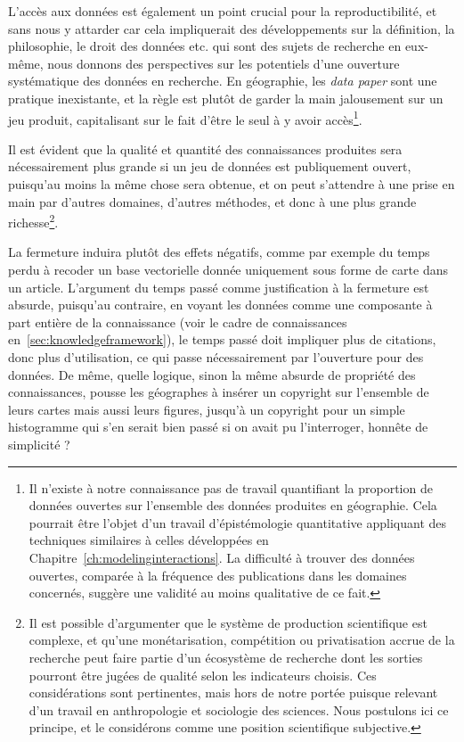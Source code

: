 L'accès aux données est également un point crucial pour la reproductibilité, et sans nous y attarder car cela impliquerait des développements sur la définition, la philosophie, le droit des données etc. qui sont des sujets de recherche en eux-même, nous donnons des perspectives sur les potentiels d'une ouverture systématique des données en recherche. En géographie, les \emph{data paper} sont une pratique inexistante, et la règle est plutôt de garder la main jalousement sur un jeu produit, capitalisant sur le fait d'être le seul à y avoir accès\footnote{Il n'existe à notre connaissance pas de travail quantifiant la proportion de données ouvertes sur l'ensemble des données produites en géographie. Cela pourrait être l'objet d'un travail d'épistémologie quantitative appliquant des techniques similaires à celles développées en Chapitre~\ref{ch:modelinginteractions}. La difficulté à trouver des données ouvertes, comparée à la fréquence des publications dans les domaines concernés, suggère une validité au moins qualitative de ce fait.}.

Il est évident que la qualité et quantité des connaissances produites sera nécessairement plus grande si un jeu de données est publiquement ouvert, puisqu'au moins la même chose sera obtenue, et on peut s'attendre à une prise en main par d'autres domaines, d'autres méthodes, et donc à une plus grande richesse\footnote{Il est possible d'argumenter que le système de production scientifique est complexe, et qu'une monétarisation, compétition ou privatisation accrue de la recherche peut faire partie d'un écosystème de recherche dont les sorties pourront être jugées de qualité selon les indicateurs choisis. Ces considérations sont pertinentes, mais hors de notre portée puisque relevant d'un travail en anthropologie et sociologie des sciences. Nous postulons ici ce principe, et le considérons comme une position scientifique subjective.}.

La fermeture induira plutôt des effets négatifs, comme par exemple du temps perdu à recoder un base vectorielle donnée uniquement sous forme de carte dans un article. L'argument du temps passé comme justification à la fermeture est absurde, puisqu'au contraire, en voyant les données comme une composante à part entière de la connaissance (voir le cadre de connaissances en~\ref{sec:knowledgeframework}), le temps passé doit impliquer plus de citations, donc plus d'utilisation, ce qui passe nécessairement par l'ouverture pour des données. De même, quelle logique, sinon la même absurde de propriété des connaissances, pousse les géographes à insérer un copyright sur l'ensemble de leurs cartes mais aussi leurs figures, jusqu'à un copyright pour un simple histogramme qui s'en serait bien passé si on avait pu l'interroger, honnête de simplicité ?

